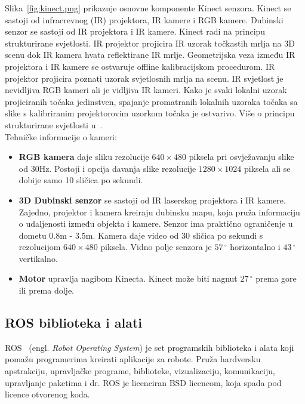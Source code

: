 Slika~\ref{fig:kinect.png} prikazuje osnovne komponente Kinect senzora.
Kinect se sastoji od infracrevnog (IR) projektora, IR kamere i RGB
kamere. Dubinski senzor se sastoji od IR projektora i IR kamere. Kinect
radi na principu strukturirane svjetlosti. IR projektor projicira IR
uzorak točkastih mrlja na 3D scenu dok IR kamera hvata reflektirane IR
mrlje. Geometrijska veza između IR projektora i IR kamere se ostvaruje
offline kalibracijskom procedurom. IR projektor projicira poznati uzorak
svjetlosnih mrlja na scenu. IR svjetlost je nevidljiva RGB kameri ali je
vidljiva IR kameri. Kako je svaki lokalni uzorak projiciranih točaka
jedinstven, spajanje promatranih lokalnih uzoraka točaka sa slike s
kalibriranim projektorovim uzorkom točaka je ostvarivo. Više o principu
strukturirane svjetlosti u~\cite{structured:light}.\\

\newpage
Tehničke informacije o kameri:
\begin{itemize}
    \item \textbf{RGB kamera} daje sliku rezolucije \(640\times480\)
        piksela pri osvježavanju slike od 30Hz. Postoji i opcija davanja
        slike rezolucije \(1280 \times 1024\) piksela ali se dobije samo 10
        sličica po sekundi.
    \item \textbf{3D Dubinski senzor} se sastoji od IR laserskog
        projektora i IR kamere. Zajedno, projektor i kamera kreiraju
        dubinsku mapu, koja pruža informaciju o udaljenosti između
        objekta i kamere. Senzor ima praktično ograničenje u dometu 
        0.8m - 3.5m. Kamera daje video od 30 sličica po sekundi s
        rezolucijom \(640 \times 480\) piksela. Vidno polje senzora je
        \(57\,^{\circ}\) horizontalno i \(43\,^{\circ}\) vertikalno.
    \item \textbf{Motor} upravlja nagibom Kinecta. Kinect može biti
        nagnut \(27\,^{\circ}\) prema gore ili prema dolje.
\end{itemize}



\newpage
\subsection{ROS biblioteka i alati} %
\label{sub:ROS biblioteka i alati}

ROS~\cite{ros} (engl. \textit{Robot Operating System}) je set programskih
biblioteka i alata koji pomažu programerima kreirati aplikacije za
robote. Pruža hardversku apstrakciju, upravljačke programe, biblioteke,
vizualizaciju, komunikaciju, upravljanje paketima i dr. ROS je
licenciran BSD licencom, koja spada pod licence otvorenog koda.

